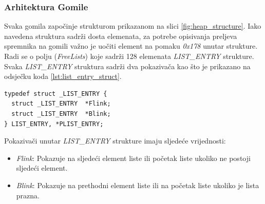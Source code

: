 \documentclass[times, utf8, diplomski, numeric]{fer}
\begin{document}
\subsubsection{Arhitektura Gomile}
Svaka gomila započinje strukturom prikazanom na slici \ref{fig:heap_structure}. Iako navedena struktura sadrži dosta elemenata, za potrebe opisivanja preljeva spremnika na gomili važno je uočiti element na pomaku \emph{0x178} unutar strukture. Radi se o polju (\emph{FreeLists}) koje sadrži 128 elemenata \emph{LIST\_ENTRY} strukture. Svaka \emph{LIST\_ENTRY} struktura sadrži dva pokazivača kao što je prikazano na odsječku koda \ref{lst:list_entry_struct}.

\begin{lstlisting}[frame=single, caption=LIST\_ENTRY struktura, label={lst:list_entry_struct}]
typedef struct _LIST_ENTRY {
  struct _LIST_ENTRY  *Flink;
  struct _LIST_ENTRY  *Blink;
} LIST_ENTRY, *PLIST_ENTRY;
\end{lstlisting}
Pokazivači unutar \emph{LIST\_ENTRY} strukture imaju sljedeće vrijednosti:
\begin{itemize}
\item \emph{Flink}: Pokazuje na sljedeći element liste ili početak liste ukoliko ne postoji sljedeći element.
\item \emph{Blink}: Pokazuje na prethodni element liste ili na početak liste ukoliko je lista prazna.
\end{itemize}
\end{document}
